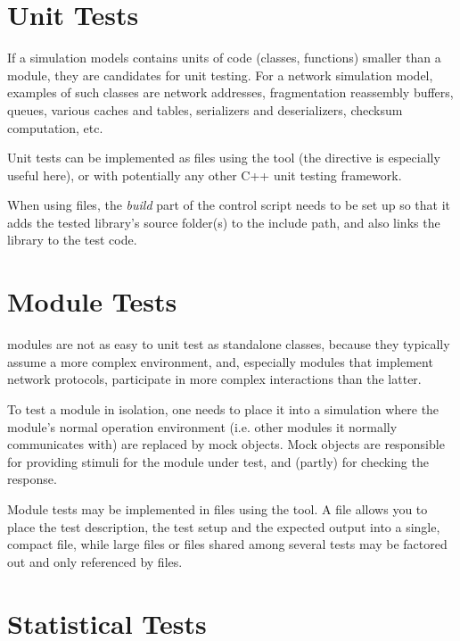 \section{Unit Tests}
\label{sec:testing:unit-tests}

If a simulation models contains units of code (classes, functions) smaller
than a module, they are candidates for unit testing. For a network simulation
model, examples of such classes are network addresses, fragmentation reassembly
buffers, queues, various caches and tables, serializers and deserializers,
checksum computation, etc.

Unit tests can be implemented as  files using the 
tool (the  directive is especially useful here), or
with potentially any other C++ unit testing framework.

When using  files, the \textit{build} part of the control script
needs to be set up so that it adds the tested library's source folder(s)
to the include path, and also links the library to the test code.



\section{Module Tests}
\label{sec:testing:module-tests}

{\opp} modules are not as easy to unit test as standalone classes, because
they typically assume a more complex environment, and, especially modules
that implement network protocols, participate in more complex interactions
than the latter.

To test a module in isolation, one needs to place it into a simulation
where the module's normal operation environment (i.e. other modules it
normally communicates with) are replaced by mock objects. Mock objects are
responsible for providing stimuli for the module under test, and (partly)
for checking the response.

Module tests may be implemented in  files using the 
tool. A  file allows you to place the test description, the test setup
and the expected output into a single, compact file, while large files or files shared
among several tests may be factored out and only referenced by  files.


\section{Statistical Tests}
\label{sec:testing:statistical-tests}

